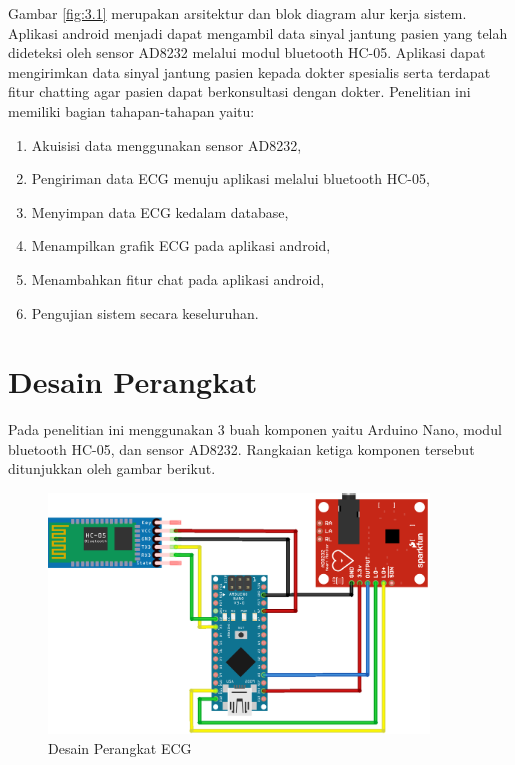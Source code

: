 Gambar \ref{fig:3.1} merupakan arsitektur dan
blok diagram alur kerja sistem. Aplikasi android menjadi dapat
mengambil data sinyal jantung pasien yang telah dideteksi
oleh sensor AD8232 melalui modul bluetooth HC-05. Aplikasi
dapat mengirimkan data sinyal jantung pasien kepada dokter
spesialis serta terdapat fitur chatting agar pasien dapat berkonsultasi dengan dokter.
Penelitian ini memiliki bagian tahapan-tahapan yaitu:
\begin{enumerate}
	\vspace{-2mm}
	\item Akuisisi data menggunakan sensor AD8232,
	\vspace{-2mm}
	\item Pengiriman data ECG menuju aplikasi melalui bluetooth HC-05,
	\vspace{-2mm}
	\item Menyimpan data ECG kedalam database,
	\vspace{-2mm}
	\item Menampilkan grafik ECG pada aplikasi android,
	\vspace{-2mm}
	\item Menambahkan fitur chat pada aplikasi android,
	\vspace{-2mm}
	\item Pengujian sistem secara keseluruhan.
\end{enumerate}
\vspace{1ex}

\section{Desain Perangkat}
\vspace{1ex}

Pada penelitian ini menggunakan 3 buah komponen yaitu Arduino Nano, modul bluetooth HC-05, dan sensor AD8232. Rangkaian ketiga komponen tersebut ditunjukkan oleh gambar berikut.
\begin{figure}[H] \centering
	\includegraphics[width=0.9\textwidth]{img/desainperangkat.png}
	\caption{Desain Perangkat ECG}
	\label{fig:3.2.0}
\end{figure}
\vspace{1ex}

